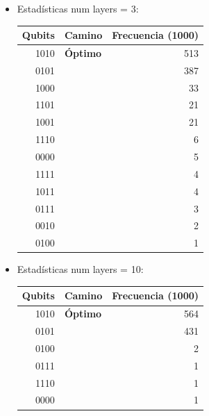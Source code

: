 \documentclass[letterpaper]{article}
\begin{document}
\begin{itemize}
\item Estadísticas num layers = 3:
\begin{center}
\begin{tabular}{|r|l|r|}
\hline
\textbf{Qubits} & \textbf{Camino} & \textbf{Frecuencia} (1000)\\
\hline
1010 & \textbf{Óptimo} & 513\\
0101 &  & 387\\
1000 &  & 33\\
1101 &  & 21\\
1001 &  & 21\\
1110 &  & 6\\
0000 &  & 5\\
1111 &  & 4\\
1011 &  & 4\\
0111 &  & 3\\
0010 &  & 2\\
0100 &  & 1\\
\hline
\end{tabular}
\end{center}

\item Estadísticas num layers = 10:
\begin{center}
\begin{tabular}{|r|l|r|}
\hline
\textbf{Qubits} & \textbf{Camino} & \textbf{Frecuencia} (1000)\\
\hline
1010 & \textbf{Óptimo} & 564\\
0101 &  & 431\\
0100 &  & 2\\
0111 &  & 1\\
1110 &  & 1\\
0000 &  & 1\\
\hline
\end{tabular}
\end{center}
\end{itemize}
\end{document}

